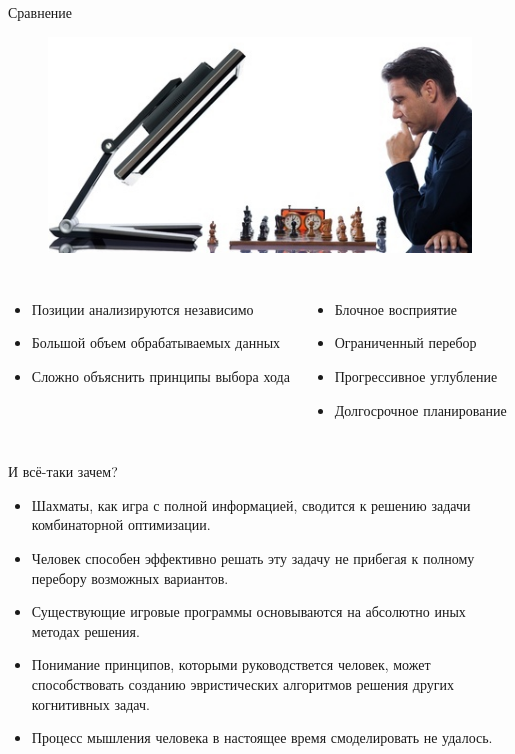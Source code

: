 
\begin{frame}{Сравнение}
\begin{figure}
\includegraphics[scale=0.55]{./pictures/vs.png}
\end{figure}
\begin{columns}
\begin{itemize}
\item Позиции анализируются независимо
\item Большой объем обрабатываемых данных
\item Сложно объяснить принципы выбора хода
\end{itemize}
\begin{itemize}
\item Блочное восприятие
\item Ограниченный перебор
\item Прогрессивное углубление
\item Долгосрочное планирование
\end{itemize}
\end{columns}

\end{frame}

\begin{frame}{И всё-таки зачем?}
\begin{itemize}
\item Шахматы, как игра с полной информацией, сводится к решению задачи комбинаторной оптимизации.
\item Человек способен эффективно решать эту задачу не прибегая к полному перебору возможных вариантов.
\item Существующие игровые программы основываются на абсолютно иных методах решения.
\item Понимание принципов, которыми руководствется человек, может способствовать созданию эвристических алгоритмов решения других когнитивных задач.
\item Процесс мышления человека в настоящее время смоделировать не удалось.
\end{itemize}
\end{frame}

